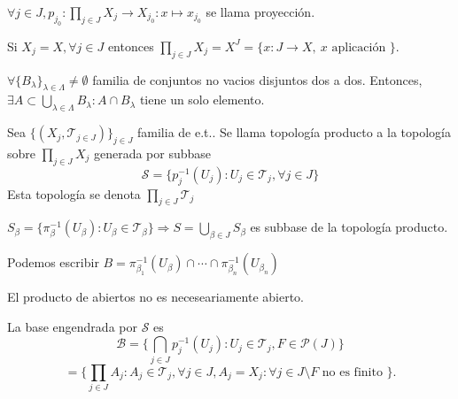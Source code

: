 \begin{obs}
  $\forall j \in J, p_{j_{0}}: \prod_{j \in J} X_{j} \to X_{j_{0}} : x \mapsto x_{j_{0}}$ se llama proyección.
\end{obs}

\begin{obs}
  Si $X_{j} = X, \forall j \in J$ entonces $\prod_{j \in J} X_{j} = X^{J} = \{ x: J \to X, \ x \text{ aplicación } \}$.
\end{obs}

\begin{defn}
  $\forall \{ B_{\lambda} \}_{\lambda \in \Lambda} \neq \emptyset$ familia de conjuntos no vacios disjuntos dos a dos. Entonces, $ \exists A \subset \bigcup_{\lambda \in \Lambda} B_{\lambda}: A \cap B_{\lambda}$ tiene un solo elemento.
\end{defn}

\begin{defn}
  Sea $\{ ( X_{j}, \mathcal{T}_{j \in J} ) \}_{j \in J}$ familia de e.t.. Se llama topología producto a la topología sobre $\prod_{j \in J} X_{j}$ generada por subbase
  \[ 
    \mathcal{S} = \{ p_{j}^{-1}(U_{j}) : U_{j} \in \mathcal{T}_{j}, \forall j \in J \} 
  \] 
  Esta topología se denota $\prod_{j \in J} \mathcal{T}_{j}$
\end{defn}

\begin{obs}
  $S_{\beta} = \{ \pi_{\beta}^{-1}(U_{\beta}) : U_{\beta} \in \mathcal{T}_{\beta} \} \Rightarrow S = \bigcup_{\beta \in J} S_{\beta}$ es subbase de la topología producto.
\end{obs}

\begin{obs}
  Podemos escribir $B = \pi_{\beta_{1}}^{-1}(U_{\beta}) \cap \cdots \cap \pi_{\beta_{n}}^{-1}(U_{\beta_{n}})$
\end{obs}

\begin{obs}
  El producto de abiertos no es neceseariamente abierto.
\end{obs}

\begin{obs}
La base engendrada por $\mathcal{S}$ es 
\[ 
  \mathcal{B} = \big\{ \bigcap_{j \in J} p_{j}^{-1}(U_{j}) : U_{j} \in \mathcal{T}_{j}, F \in \mathcal{P}(J) \big\}
\]
\[ 
  = \big\{  \prod_{j \in J} A_{j} : A_{j} \in \mathcal{T}_{j}, \forall j \in J, A_{j} = X_{j} : \forall j \in J \setminus F \text{ no es finito } \big\}.
\] 
\end{obs}


